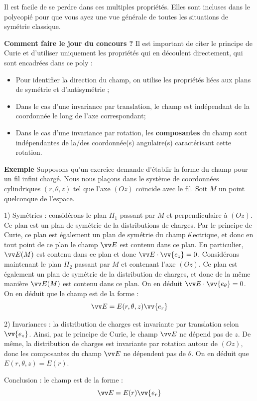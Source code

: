 \documentclass[11pt,fleqn]{book} %
\begin{document}
\begin{encart}
    Il est facile de se perdre dans ces multiples propriétés. Elles sont incluses dans le polycopié pour que vous ayez une vue générale de toutes les situations de symétrie classique.

    \textbf{Comment faire le jour du concours ?} Il est important de citer le principe de Curie et d'utiliser uniquement les propriétés qui en découlent directement, qui sont encadrées dans ce poly :
    \begin{itemize}
        \item Pour identifier la direction du champ, on utilise les propriétés liées aux plans de symétrie et d'antisymétrie ;
        \item Dans le cas d'une invariance par translation, le champ est indépendant de la coordonnée le long de l'axe correspondant;
        \item Dans le cas d'une invariance par rotation, les \textbf{composantes} du champ sont indépendantes de la/des coordonnée(s) angulaire(s) caractérisant cette rotation.
    \end{itemize}

\textbf{Exemple} Supposons qu'un exercice demande d'établir la forme du champ pour un fil infini chargé. Nous nous plaçons dans le système de coordonnées cylindriques $(r,\theta,z)$ tel que l'axe $(Oz)$ coïncide avec le fil. Soit $M$ un point quelconque de l'espace.

1) Symétries : considérons le plan $\Pi_1$ passant par $M$ et perpendiculaire à $(Oz)$. Ce plan est un plan de symétrie de la distributions de charges. Par le principe de Curie, ce plan est également un plan de symétrie du champ électrique, et donc en tout point de ce plan le champ $\vv E$ est contenu dans ce plan. En particulier, $\vv E(M)$ est contenu dans ce plan et donc $\vv E \cdot \vv{e_z} = 0$. Considérons maintenant le plan $\Pi_2$ passant par $M$ et contenant l'axe $(Oz)$. Ce plan est également un plan de symétrie de la distribution de charges, et donc de la même manière $\vv E(M)$ est contenu dans ce plan. On en déduit $\vv E \cdot \vv{e_\theta} = 0$. On en déduit que le champ est de la forme :
\begin{equation}
    \vv E = E(r,\theta,z) \vv{e_r} 
\end{equation}
    
2) Invariances : la distribution de charges est invariante par translation selon $\vv{e_z}$. Ainsi, par le principe de Curie, le champ $\vv E$ ne dépend pas de $z$. De même, la distribution de charges est invariante par rotation autour de $(Oz)$, donc les composantes du champ $\vv E$ ne dépendent pas de $\theta$. On en déduit que $E(r,\theta,z) = E(r)$.

Conclusion : le champ est de la forme :
\begin{equation}
    \vv E = E(r) \vv{e_r} 
\end{equation}

\end{encart}
\end{document}
